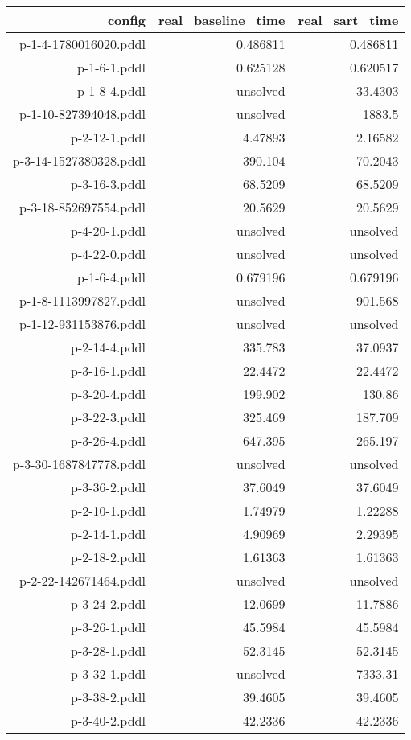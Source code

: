 \documentclass{article}
\begin{document}
                            \begin{center}
                            \scriptsize
                            \begin{tabular}{r|r|r}
                            config & real\_baseline\_time & real\_sart\_time\\\midrule
                             p-1-4-1780016020.pddl&0.486811&0.486811\\
 p-1-6-1.pddl&0.625128&0.620517\\
 p-1-8-4.pddl&unsolved&33.4303\\
 p-1-10-827394048.pddl&unsolved&1883.5\\
 p-2-12-1.pddl&4.47893&2.16582\\
 p-3-14-1527380328.pddl&390.104&70.2043\\
 p-3-16-3.pddl&68.5209&68.5209\\
 p-3-18-852697554.pddl&20.5629&20.5629\\
 p-4-20-1.pddl&unsolved&unsolved\\
 p-4-22-0.pddl&unsolved&unsolved\\
 p-1-6-4.pddl&0.679196&0.679196\\
 p-1-8-1113997827.pddl&unsolved&901.568\\
 p-1-12-931153876.pddl&unsolved&unsolved\\
 p-2-14-4.pddl&335.783&37.0937\\
 p-3-16-1.pddl&22.4472&22.4472\\
 p-3-20-4.pddl&199.902&130.86\\
 p-3-22-3.pddl&325.469&187.709\\
 p-3-26-4.pddl&647.395&265.197\\
 p-3-30-1687847778.pddl&unsolved&unsolved\\
 p-3-36-2.pddl&37.6049&37.6049\\
 p-2-10-1.pddl&1.74979&1.22288\\
 p-2-14-1.pddl&4.90969&2.29395\\
 p-2-18-2.pddl&1.61363&1.61363\\
 p-2-22-142671464.pddl&unsolved&unsolved\\
 p-3-24-2.pddl&12.0699&11.7886\\
 p-3-26-1.pddl&45.5984&45.5984\\
 p-3-28-1.pddl&52.3145&52.3145\\
 p-3-32-1.pddl&unsolved&7333.31\\
 p-3-38-2.pddl&39.4605&39.4605\\
 p-3-40-2.pddl&42.2336&42.2336
                            \end{tabular}
                            \end{center}
                    
\end{document}
